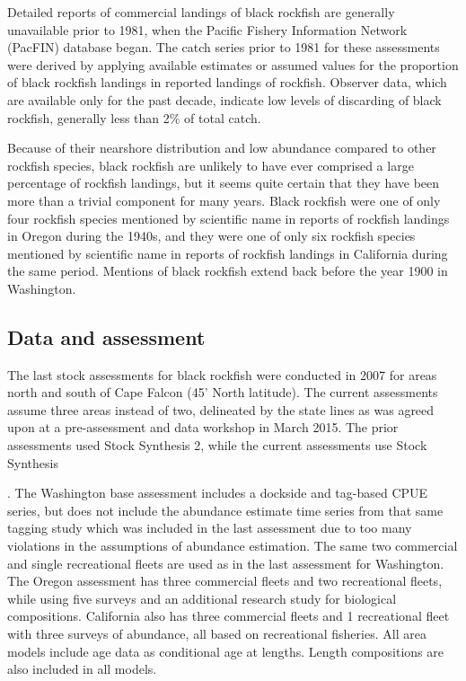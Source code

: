 \documentclass[11pt,
  english,
  letterpaper,
]{article}
\begin{document}
Detailed reports of commercial landings of black rockfish are generally unavailable prior to 1981, when the Pacific Fishery Information Network (PacFIN) database began. The catch series prior to 1981 for these assessments were derived by applying available estimates or assumed values for the proportion of black rockfish landings in reported landings of rockfish. Observer data, which are available only for the past decade, indicate low levels of discarding of black rockfish, generally less than 2\% of total catch.

Because of their nearshore distribution and low abundance compared to other rockfish species, black rockfish are unlikely to have ever comprised a large percentage of rockfish landings, but it seems quite certain that they have been more than a trivial component for many years. Black rockfish were one of only four rockfish species mentioned by scientific name in reports of rockfish landings in Oregon during the 1940s, and they were one of only six rockfish species mentioned by scientific name in reports of rockfish landings in California during the same period. Mentions of black rockfish extend back before the year 1900 in Washington.

\hypertarget{data-and-assessment}{%
\subsection*{Data and assessment}\label{data-and-assessment}}

The last stock assessments for black rockfish were conducted in 2007 for areas north and south of Cape Falcon (45' North latitude). The current assessments assume three areas instead of two, delineated by the state lines as was agreed upon at a pre-assessment and data workshop in March 2015. The prior assessments used Stock Synthesis 2, while the current assessments use Stock Synthesis

. The Washington base assessment includes a dockside and tag-based CPUE series, but does not include the abundance estimate time series from that same tagging study which was included in the last assessment due to too many violations in the assumptions of abundance estimation. The same two commercial and single recreational fleets are used as in the last assessment for Washington. The Oregon assessment has three commercial fleets and two recreational fleets, while using five surveys and an additional research study for biological compositions. California also has three commercial fleets and 1 recreational fleet with three surveys of abundance, all based on recreational fisheries. All area models include age data as conditional age at lengths. Length compositions are also included in all models.
\end{document}
